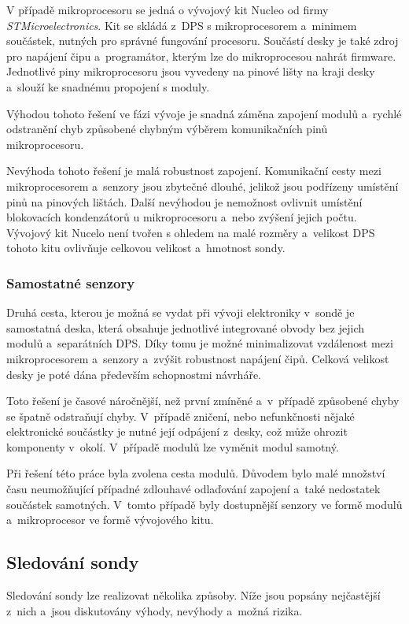 \documentclass[twoside]{ctuthesis}
\theoremstyle{plain}
\theoremstyle{definition}
\theoremstyle{note}
\begin{document}
			V případě mikroprocesoru se jedná o vývojový kit Nucleo od firmy \textit{STMicroelectronics}. Kit se skládá z~DPS s mikroprocesorem a~minimem součástek, nutných pro správné fungování procesoru. Součástí desky je také zdroj pro napájení čipu a~programátor, kterým lze do mikroprocesou nahrát firmware. Jednotlivé piny mikroprocesoru jsou vyvedeny na pinové lišty na kraji desky a~slouží ke snadnému propojení s moduly. 

			Výhodou tohoto řešení ve fázi vývoje je snadná záměna zapojení modulů a~rychlé odstranění chyb způsobené chybným výběrem komunikačních pinů mikroprocesoru.

			Nevýhoda tohoto řešení je malá robustnost zapojení. Komunikační cesty mezi mikroprocesorem a~senzory jsou zbytečné dlouhé, jelikož jsou podřízeny umístění pinů na pinových lištách. Další nevýhodou je nemožnost ovlivnit umístění blokovacích kondenzátorů u mikroprocesoru a~nebo zvýšení jejich počtu. Vývojový kit Nucelo není tvořen s ohledem na malé rozměry a~velikost DPS tohoto kitu ovlivňuje celkovou velikost a~hmotnost sondy.

			\subsubsection{Samostatné senzory}
			Druhá cesta, kterou je možná se vydat při vývoji elektroniky v~sondě je samostatná deska, která obsahuje jednotlivé integrované obvody bez jejich modulů a~separátních DPS. Díky tomu je možné minimalizovat vzdálenost mezi mikroprocesorem a~senzory a~zvýšit robustnost napájení čipů. Celková velikost desky je poté dána především schopnostmi návrháře. 

			Toto řešení je časové náročnější, než první zmíněné a~v~případě způsobené chyby se špatně odstraňují chyby. V~případě zničení, nebo nefunkčnosti nějaké elektronické součástky je nutné její odpájení z~desky, což může ohrozit komponenty v~okolí. V~případě modulů lze vyměnit modul samotný.

			Při řešení této práce byla zvolena cesta modulů. Důvodem bylo malé množství času neumožňující případné zdlouhavé odlaďování zapojení a~také nedostatek součástek samotných. V~tomto případě byly dostupnější senzory ve formě modulů a~mikroprocesor ve formě vývojového kitu. 

			
		\subsection{Sledování sondy}
		Sledování sondy lze realizovat několika způsoby. Níže jsou popsány nejčastější z~nich a~jsou diskutovány výhody, nevýhody a~možná rizika.
\end{document}

